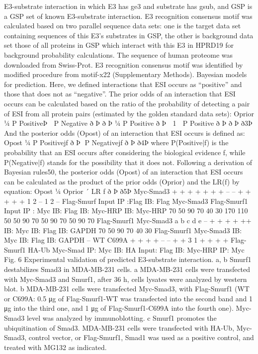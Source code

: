 E3-substrate interaction in which E3 has ge3 and substrate has gsub, and GSP is a
GSP set of known E3-substrate interaction.
E3 recognition consensus motif was calculated based on two parallel sequence
data sets: one is the target data set containing sequences of this E3’s substrates in
GSP, the other is background data set those of all proteins in GSP which interact
with this E3 in HPRD19 for background probability calculations. The sequence of
human proteome was downloaded from Swiss-Prot. E3 recognition consensus
motif was identiﬁed by modiﬁed procedure from motif-x22 (Supplementary
Methods).
Bayesian models for prediction. Here, we deﬁned interactions that ESI occurs as
“positive” and those that does not as “negative”. The prior odds of an interaction
that ESI occurs can be calculated based on the ratio of the probability of detecting a
pair of ESI from all protein pairs (estimated by the golden standard data sets):
Oprior ¼ P PositiveÞ  P Negative
ð
Þ
ð
Þ ¼ P Positive
ð
Þ  1  P Positive
ð
Þ
ð
Þ
ð3Þ
And the posterior odds (Opost) of an interaction that ESI occurs is deﬁned as:
Opost ¼ P Positivejf
ð
Þ  P Negativejf
ð
Þ
ð4Þ
where P(Positive|f) is the probability that an ESI occurs after considering the
biological evidence f, while P(Negative|f) stands for the possibility that it does not.
Following a derivation of Bayesian rules50, the posterior odds (Opost) of an
interaction that ESI occurs can be calculated as the product of the prior odds
(Oprior) and the LR(f) by equation:
Opost ¼ Oprior ´ LR f
ð Þ
ð5Þ
Myc-Smad3
+ +
+
+ +
+
+
–
–
+
+
+
+
+
1
2
–
1
2
–
Flag-Smurf
Input
IP :Flag
IB: Flag
Myc-Smad3
Flag-Smurf1
Input
IP : Myc
IB: Flag
IB: Myc-HRP
IB: Myc-HRP
70
50
90
70
40
30
170
110
50
50
90
70
50
90
70
50
90
70
Flag-Smurf1
Myc-Smad3
a
b
c
d
e
–
+
+
+
+
++
IB: Myc
IB: Flag
IB: GAPDH
70
50
90
70
40
30
Flag-Smurf1
Myc-Smad3
IB: Myc
IB: Flag
IB: GAPDH
–
WT C699A
+
+
+
+
–
–
+
+
3
1
+ + + +
Flag-Smurf1
HA-Ub
Myc-Smad
IP: Myc
IB: HA
Input: Flag
IB: Myc-HRP
IP: Myc
Fig. 6 Experimental validation of predicted E3-substrate interaction. a, b Smurf1 destabilizes Smad3 in MDA-MB-231 cells. a MDA-MB-231 cells were
transfected with Myc-Smad3 and Smurf1, after 36 h, cells lysates were analyzed by western blot. b MDA-MB-231 cells were transfected Myc-Smad3, with
Flag-Smurf1 (WT or C699A: 0.5 μg of Flag-Smurf1-WT was transfected into the second band and 1 μg into the third one, and 1 μg of Flag-Smurf1-C699A
into the fourth one). Myc-Smad3 level was analyzed by immunoblotting. c Smurf1 promotes the ubiquitination of Smad3. MDA-MB-231 cells were
transfected with HA-Ub, Myc-Smad3, control vector, or Flag-Smurf1, Smad1 was used as a positive control, and treated with MG132 as indicated.

